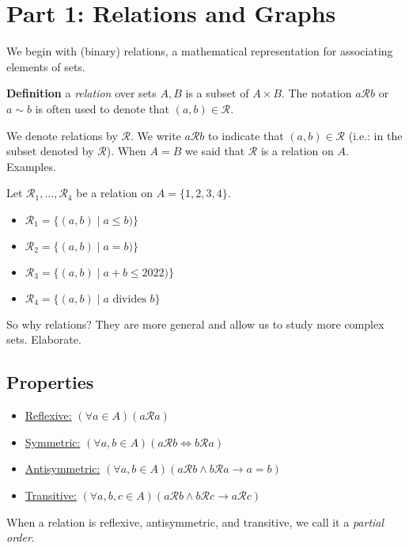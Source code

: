 \documentclass{article}
\begin{document}
\section*{Part 1: Relations and Graphs}

    
    We begin with (binary) relations, a mathematical representation for associating elements of sets.
    
    \vspace{3mm}
    \textbf{Definition} a \textit{relation} over sets $A, B$ is a subset of $A \times B$. The notation $a\mathcal{R}b$ or $a \sim b$ is often used to denote that $(a, b) \in \mathcal{R}$.
    
    \vspace{1.5mm}
    We denote relations by $\mathcal{R}$. We write $a\mathcal{R} b$ to indicate that $(a,b)\in \mathcal{R}$ (i.e.: in the subset denoted by $\mathcal{R}$). When $A=B$ we said that $\mathcal{R}$ is a relation on $A$.\\

    Examples.
    
    Let $\mathcal{R}_1, \dots, \mathcal{R}_4$ be a relation on $A = \{1, 2, 3, 4\}$.
    \begin{itemize}
        \item $\mathcal{R}_1 = \{(a, b) \mid a \le b)\}$
        \item $\mathcal{R}_2 = \{(a, b) \mid a = b)\}$
        \item $\mathcal{R}_3 = \{(a, b) \mid a+b \le 2022)\}$
        \item $\mathcal{R}_4 = \{(a, b) \mid a \text{ divides } b\}$
    \end{itemize}
    So why relations? They are more general and allow us to study more complex sets. Elaborate. \\
    
\subsection*{Properties}
    
    \begin{itemize}
        \item \underline{Reflexive:} $(\forall a \in A)(a\mathcal{R}a)$
        \item \underline{Symmetric:} $(\forall a, b \in A)(a\mathcal{R}b \iff b\mathcal{R}a)$
        \item \underline{Antisymmetric:} $(\forall a, b\in A)(a\mathcal{R}b \wedge b\mathcal{R}a \rightarrow a=b)$
        \item \underline{Transitive:} $(\forall a, b, c\in A)(a\mathcal{R}b \wedge b\mathcal{R}c \rightarrow a\mathcal{R}c)$
    \end{itemize}
When a relation is reflexive, antisymmetric, and transitive, we call it a \textit{partial order}.
\end{document}
